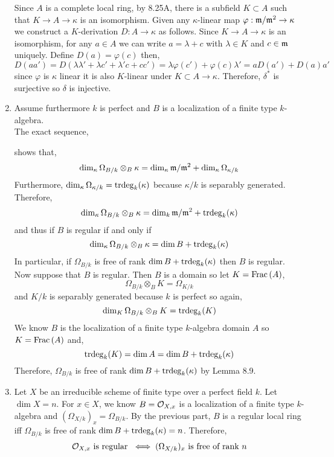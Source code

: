 \documentclass[12pt]{article}
\begin{document}
\begin{enumerate}
Since $A$ is a complete local ring, by 8.25A, there is a subfield $K \subset A$ such that $K \to A \to \kappa$ is an isomorphism. Given any $\kappa$-linear map $\varphi : \mathfrak{m} / \mathfrak{m}^2 \to \kappa$ we construct a $K$-derivation $D : A \to \kappa$ as follows. Since $K \to A \to \kappa$ is an isomorphism, for any $a \in A$ we can write $a = \lambda + c$ with $\lambda \in K$ and $c \in \mathfrak{m}$ uniquely. Define $D(a) = \varphi(c)$ then,
\[ D(aa') = D(\lambda \lambda' + \lambda c' + \lambda' c + c c') = \lambda \varphi(c') + \varphi(c) \lambda' = a D(a') + D(a) a' \]
since $\varphi$ is $\kappa$ linear it is also $K$-linear under $K \subset A \to \kappa$. Therefore, $\delta^*$ is surjective so $\delta$ is injective.

\item Assume furthermore $k$ is perfect and $B$ is a localization of a finite type $k$-algebra. 
\bigskip\\
The exact sequence,
\begin{center}
\end{center}
shows that,
\[ \dim_\kappa \Omega_{B/k} \otimes_B \kappa = \dim_\kappa \mathfrak{m}/\mathfrak{m}^2 + \dim_\kappa \Omega_{\kappa/k} \]
Furthermore, $\dim_\kappa \Omega_{\kappa / k} = \mathrm{trdeg}_{k}(\kappa)$ because $\kappa / k$ is separably generated. Therefore,
\[ \dim_\kappa \Omega_{B/k} \otimes_B \kappa = \dim_k \mathfrak{m}/\mathfrak{m}^2 + \mathrm{trdeg}_{k}(\kappa) \]
and thus if $B$ is regular if and only if
\[ \dim_\kappa \Omega_{B/k} \otimes_B \kappa = \dim{B} + \mathrm{trdeg}_{k}(\kappa) \]
In particular, if $\Omega_{B/k}$ is free of rank $\dim{B} + \mathrm{trdeg}_{k}(\kappa)$ then $B$ is regular. 
\bigskip\\
Now suppose that $B$ is regular. Then $B$ is a domain so let $K = \mathrm{Frac}\left(A\right)$,
\[ \Omega_{B/k} \otimes_B K = \Omega_{K/k} \]
and $K / k$ is separably generated because $k$ is perfect so again,
\[ \dim_{K} \Omega_{B/k} \otimes_B K = \mathrm{trdeg}_{k}(K) \]
We know $B$ is the localization of a finite type $k$-algebra domain $A$ so $K = \mathrm{Frac}\left(A\right)$ and,
\[ \mathrm{trdeg}_{k}(K) = \dim{A} = \dim{B} + \mathrm{trdeg}_{k}(\kappa) \]
Therefore, $\Omega_{B/k}$ is free of rank $\dim{B} + \mathrm{trdeg}_{k}(\kappa)$ by Lemma 8.9.

\item Let $X$ be an irreducible scheme of finite type over a perfect field $k$. Let $\dim{X} = n$. For $x \in X$, we know $B = \mathcal{O}_{X, x}$ is a localization of a finite type $k$-algebra and $(\Omega_{X/k})_x = \Omega_{B/k}$. By the previous part, $B$ is a regular local ring iff $\Omega_{B/k}$ is free of rank $\dim{B} + \mathrm{trdeg}_{k}(\kappa) = n$. Therefore, 
\[ \mathcal{O}_{X, x} \text{ is regular } \iff (\Omega_{X/k})_x \text{ is free of rank } n \]


\end{enumerate}
\end{document}

